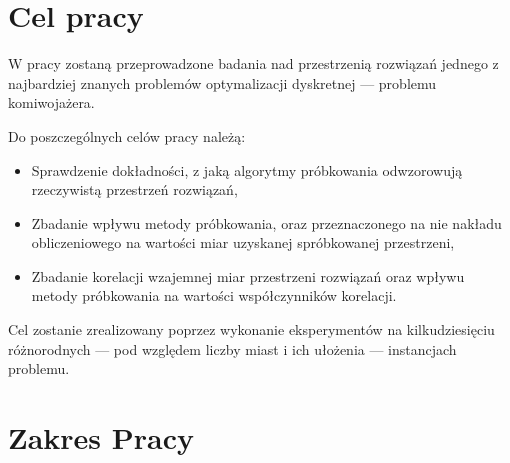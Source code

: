 \section{Cel pracy}
W pracy zostaną przeprowadzone badania nad przestrzenią rozwiązań jednego z najbardziej znanych problemów optymalizacji dyskretnej --- problemu komiwojażera.

Do poszczególnych celów pracy należą:
\begin{itemize}
    \item Sprawdzenie dokładności, z jaką algorytmy próbkowania odwzorowują rzeczywistą przestrzeń rozwiązań,
    \item Zbadanie wpływu metody próbkowania, oraz przeznaczonego na nie nakładu obliczeniowego na wartości miar uzyskanej spróbkowanej przestrzeni,
    \item Zbadanie korelacji wzajemnej miar przestrzeni rozwiązań oraz wpływu metody próbkowania na wartości współczynników korelacji.
\end{itemize}

Cel zostanie zrealizowany poprzez wykonanie eksperymentów na kilkudziesięciu różnorodnych --- pod względem liczby miast i ich ułożenia --- instancjach problemu.

\section{Zakres Pracy}

